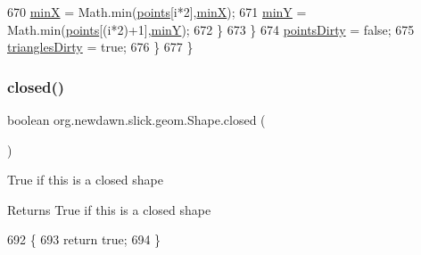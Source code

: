 \begin{DoxyCode}
670                     \mbox{\hyperlink{classorg_1_1newdawn_1_1slick_1_1geom_1_1_shape_a5bd07629e85d4a15fc03e3d60edb7c03}{minX}} = Math.min(\mbox{\hyperlink{classorg_1_1newdawn_1_1slick_1_1geom_1_1_shape_a8b4d4058734bbb3b96072e470b92aa37}{points}}[i*2],\mbox{\hyperlink{classorg_1_1newdawn_1_1slick_1_1geom_1_1_shape_a5bd07629e85d4a15fc03e3d60edb7c03}{minX}});
671                     \mbox{\hyperlink{classorg_1_1newdawn_1_1slick_1_1geom_1_1_shape_a4794592d5238a8c51d9d8ac4a11e68d4}{minY}} = Math.min(\mbox{\hyperlink{classorg_1_1newdawn_1_1slick_1_1geom_1_1_shape_a8b4d4058734bbb3b96072e470b92aa37}{points}}[(i*2)+1],\mbox{\hyperlink{classorg_1_1newdawn_1_1slick_1_1geom_1_1_shape_a4794592d5238a8c51d9d8ac4a11e68d4}{minY}});
672                 \}
673             \}
674             \mbox{\hyperlink{classorg_1_1newdawn_1_1slick_1_1geom_1_1_shape_a61fe1954d2fdefc72c34b284f4fcfdb4}{pointsDirty}} = \textcolor{keyword}{false};
675             \mbox{\hyperlink{classorg_1_1newdawn_1_1slick_1_1geom_1_1_shape_a9300b64ed3c260451f38151305e7c85e}{trianglesDirty}} = \textcolor{keyword}{true};
676         \}
677     \}
\end{DoxyCode}
\mbox{\label{classorg_1_1newdawn_1_1slick_1_1geom_1_1_shape_a95d6725fbfa1ab9baff9bd721da82241}} 
\subsubsection{\texorpdfstring{closed()}{closed()}}
{\footnotesize\ttfamily boolean org.\+newdawn.\+slick.\+geom.\+Shape.\+closed (\begin{DoxyParamCaption}{ }\end{DoxyParamCaption})\hspace{0.3cm}{\ttfamily [inline]}}

True if this is a closed shape

\begin{DoxyReturn}{Returns}
True if this is a closed shape 
\end{DoxyReturn}

\begin{DoxyCode}
692                             \{
693         \textcolor{keywordflow}{return} \textcolor{keyword}{true};
694     \}
\end{DoxyCode}
\mbox{\label{classorg_1_1newdawn_1_1slick_1_1geom_1_1_shape_ae9dcbe23fb1bcd01bac0ddcfe09685de}} 

